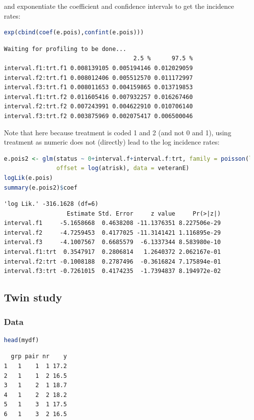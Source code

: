 \documentclass{article}
\begin{document}
and exponentiate the coefficient and confidence intervals to get the incidence rates:
\begin{lstlisting}[language=r,numbers=none]
exp(cbind(coef(e.pois),confint(e.pois)))
\end{lstlisting}

\label{}
\begin{verbatim}
Waiting for profiling to be done...
                                     2.5 %      97.5 %
interval.f1:trt.f1 0.008139105 0.005194146 0.012029059
interval.f2:trt.f1 0.008012406 0.005512570 0.011172997
interval.f3:trt.f1 0.008011653 0.004159865 0.013719853
interval.f1:trt.f2 0.011605416 0.007932257 0.016267460
interval.f2:trt.f2 0.007243991 0.004622910 0.010706140
interval.f3:trt.f2 0.003875969 0.002075417 0.006500046
\end{verbatim}


Note that here because treatment is coded 1 and 2 (and not 0 and 1),
using treatment as numeric does not (directly) lead to the log incidence rates:
\begin{lstlisting}[language=r,numbers=none]
e.pois2 <- glm(status ~ 0+interval.f+interval.f:trt, family = poisson(link="log"),
               offset = log(atrisk), data = veteranE)
logLik(e.pois)
summary(e.pois2)$coef
\end{lstlisting}

\label{}
\begin{verbatim}
'log Lik.' -316.1628 (df=6)
                  Estimate Std. Error     z value     Pr(>|z|)
interval.f1     -5.1658668  0.4638208 -11.1376351 8.227506e-29
interval.f2     -4.7259453  0.4177025 -11.3141421 1.116895e-29
interval.f3     -4.1007567  0.6685579  -6.1337344 8.583980e-10
interval.f1:trt  0.3547917  0.2806814   1.2640372 2.062167e-01
interval.f2:trt -0.1008188  0.2787496  -0.3616824 7.175894e-01
interval.f3:trt -0.7261015  0.4174235  -1.7394837 8.194972e-02
\end{verbatim}
\subsection{Twin study}
\label{sec:orgff2fd41}
\subsubsection{Data}
\label{sec:orgc35a1a6}

\begin{lstlisting}[language=r,numbers=none]
head(mydf)
\end{lstlisting}
\label{}
\begin{verbatim}
  grp pair nr    y
1   1    1  1 17.2
2   1    1  2 16.5
3   1    2  1 18.7
4   1    2  2 18.2
5   1    3  1 17.5
6   1    3  2 16.5
\end{verbatim}
\end{document}
